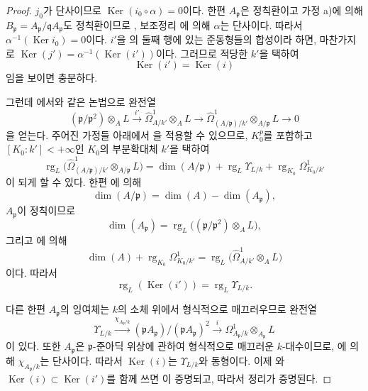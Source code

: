 \begin{proof}
$j_0$가 단사이므로
$\operatorname{Ker}(i_0\circ\alpha)=0$이다. 한편
$A_{\mathfrak p}$은 정칙환이고 가정 a)에 의해
$B_{\mathfrak p}=A_{\mathfrak p}/\mathfrak qA_{\mathfrak p}$도
정칙환이므로 , 보조정리
에 의해 $\alpha$는 단사이다. 따라서
$\alpha^{-1}(\operatorname{Ker}i_0)=0$이다. $i'$을
의 둘째 행에 있는 준동형들의 합성이라 하면,
마찬가지로
$\operatorname{Ker}(j')=\alpha^{-1}(\operatorname{Ker}(i'))$이다.
그러므로 적당한 $k'$을 택하여
\begin{equation}
\label{0.22.7.3.3-ko}
  \operatorname{Ker}(i')=\operatorname{Ker}(i)
  \tag{22.7.3.3}
\end{equation}
임을 보이면 충분하다.

그런데 에서와 같은 논법으로 완전열
\[
  (\mathfrak p/\mathfrak p^2)\otimes_AL\xrightarrow{i'}
  \widehat\Omega^1_{A/k'}\otimes_AL\longrightarrow
  \widehat\Omega^1_{(A/\mathfrak p)/k'}\otimes_{A/\mathfrak p}L
  \longrightarrow0
\]
을 얻는다. 주어진 가정들 아래에서 을 적용할 수
있으므로, $K_0^p$를 포함하고 $[K_0:k']<+\infty$인 $K_0$의
부분확대체 $k'$을 택하여
\[
  \operatorname{rg}_L\bigl(\widehat\Omega^1_{(A/\mathfrak p)/k'}
  \otimes_{A/\mathfrak p}L\bigr)
  =\dim(A/\mathfrak p)+\operatorname{rg}_L\Upsilon_{L/k}
  +\operatorname{rg}_{K_0}\Omega^1_{K_0/k'}
\]
이 되게 할 수 있다. 한편 에 의해
\[
  \dim(A/\mathfrak p)=\dim(A)-\dim(A_{\mathfrak p}),
\]
$A_{\mathfrak p}$이 정칙이므로 
\[
  \dim(A_{\mathfrak p})
  =\operatorname{rg}_L\bigl((\mathfrak p/\mathfrak p^2)\otimes_AL\bigr),
\]
그리고 에 의해
\[
  \dim(A)+\operatorname{rg}_{K_0}\Omega^1_{K_0/k'}
  =\operatorname{rg}_L\bigl(\widehat\Omega^1_{A/k'}\otimes_AL\bigr)
\]
이다. 따라서
\begin{equation}
\label{0.22.7.3.4-ko}
  \operatorname{rg}_L(\operatorname{Ker}(i'))
  =\operatorname{rg}_L\Upsilon_{L/k}.
  \tag{22.7.3.4}
\end{equation}

다른 한편 $A_{\mathfrak p}$의 잉여체는 $k$의 소체 위에서
형식적으로 매끄러우므로 완전열 
\[
  \Upsilon_{L/k}\xrightarrow{\chi_{A_{\mathfrak p}/k}}
  (\mathfrak pA_{\mathfrak p})/(\mathfrak pA_{\mathfrak p})^2
  \xrightarrow{i}\Omega^1_{A_{\mathfrak p}/k}
  \otimes_{A_{\mathfrak p}}L
\]
이 있다. 또한 $A_{\mathfrak p}$은 $\mathfrak p$-준아딕 위상에 관하여
형식적으로 매끄러운 $k$-대수이므로, 에 의해
$\chi_{A_{\mathfrak p}/k}$는 단사이다. 따라서
$\operatorname{Ker}(i)$는 $\Upsilon_{L/k}$와 동형이다.
이제 와
$\operatorname{Ker}(i)\subset\operatorname{Ker}(i')$를 함께 쓰면
이 증명되고, 따라서 정리가 증명된다.
\end{proof}

